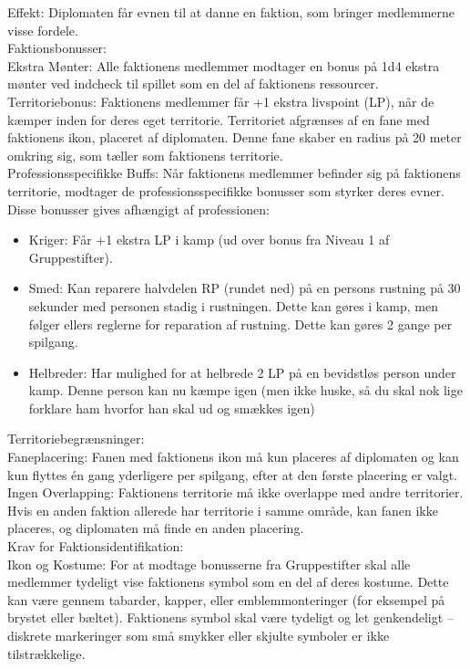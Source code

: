 Effekt: Diplomaten får evnen til at danne en faktion, som bringer medlemmerne visse fordele.\\
Faktionsbonusser:\\
Ekstra Mønter: Alle faktionens medlemmer modtager en bonus på 1d4 ekstra mønter ved indcheck til spillet som en del af faktionens ressourcer.\\
Territoriebonus: Faktionens medlemmer får +1 ekstra livspoint (LP), når de kæmper inden for deres eget territorie. Territoriet afgrænses af en fane med faktionens ikon, placeret af diplomaten. Denne fane skaber en radius på 20 meter omkring sig, som tæller som faktionens territorie.\\
Professionsspecifikke Buffs: Når faktionens medlemmer befinder sig på faktionens territorie, modtager de professionsspecifikke bonusser som styrker deres evner. Disse bonusser gives afhængigt af professionen:
\begin{itemize}
    \item Kriger: Får +1 ekstra LP i kamp (ud over bonus fra Niveau 1 af Gruppestifter).
    \item Smed: Kan reparere halvdelen RP (rundet ned) på en persons rustning på 30 sekunder med personen stadig i rustningen. Dette kan gøres i kamp, men følger ellers reglerne for reparation af rustning. Dette kan gøres 2 gange per spilgang.
    \item Helbreder: Har mulighed for at helbrede 2 LP på en bevidstløs person under kamp. Denne person kan nu kæmpe igen (men ikke huske, så du skal nok lige forklare ham hvorfor han skal ud og smækkes igen)
\end{itemize}

Territoriebegrænsninger:\\
Faneplacering: Fanen med faktionens ikon må kun placeres af diplomaten og kan kun flyttes én gang yderligere per spilgang, efter at den første placering er valgt.\\
Ingen Overlapping: Faktionens territorie må ikke overlappe med andre territorier. Hvis en anden faktion allerede har territorie i samme område, kan fanen ikke placeres, og diplomaten må finde en anden placering.\\
Krav for Faktionsidentifikation:\\
Ikon og Kostume: For at modtage bonusserne fra Gruppestifter skal alle medlemmer tydeligt vise faktionens symbol som en del af deres kostume. Dette kan være gennem tabarder, kapper, eller emblemmonteringer (for eksempel på brystet eller bæltet). Faktionens symbol skal være tydeligt og let genkendeligt – diskrete markeringer som små smykker eller skjulte symboler er ikke tilstrækkelige.\\





